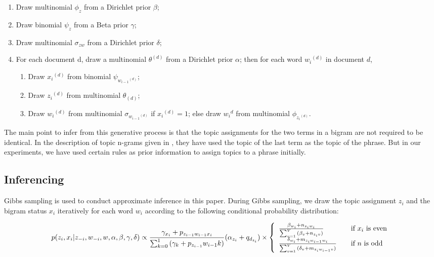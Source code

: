 \begin{enumerate}
 \item Draw multinomial \(\phi_z\) from a Dirichlet prior \(\beta\);
 \item Draw binomial \(\psi_z\) from a Beta prior \(\gamma\);
 \item Draw multinomial \(\sigma_{zw}\) from a Dirichlet prior \(\delta\);
 \item For each document d, draw a multinomial \(θ^{(d)}\) from a Dirichlet prior \(\alpha\); then for each word \({w_i}^{(d)}\) in document \(d\),
    \begin{enumerate}
     \item Draw \({x_i}^{(d)}\) from binomial \(\psi_{{w_{i-1}}^{(d)}}\);
     \item Draw \({z_i}^{(d)}\) from multinomial \(\theta_{(d)}\);
     \item Draw \({w_i}^{(d)}\) from multinomial \(\sigma_{{w_{i-1}}^{(d)}}\) if \({x_i}^{(d)} = 1\); else draw \({w_i}^{d}\) from multinomial \(\phi_{{z_i}^{(d)}}\).
    \end{enumerate}
\end{enumerate}

The main point to infer from this generative process is that the topic assignments for the two terms in a bigram are not required to be identical. In the description of
topic n-grams given in \citep*{wang2005note}, they have used the topic of the last term as the topic of the phrase. But in our experiments, we have used certain rules
as prior information to assign topics to a phrase initially.

\subsection{Inferencing}

Gibbs sampling is used to conduct approximate inference in this paper. During Gibbs sampling, we draw the topic assignment \(z_i\) and the bigram status \(x_i\) iteratively
for each word \(w_i\) according to the following conditional probability distribution:

\begin{equation}
p(z_i,x_i | z_{-i},w_{-i},w,\alpha,\beta,\gamma,\delta) \propto
\frac{\gamma_{x_i} + p_{z_{i-1}w_{i-1}x_i}}{\sum_{k=0}^1 {(\gamma_k+p_{z_{i-1}}w_{i-1}k)}} {(\alpha_{z_i} + q_{d_{z_i}})} \times \left\{ 
  \begin{array}{l l}
    \frac{\beta_{w_i} + n_{z_i w_i}}{\sum_{v=1}^V {(\beta_v+n_{z_i v})}} & \quad \text{if $x_i$ is even}\\
    \frac{\delta_{w_i} + m_{z_i w_{i-1} w_i}}{\sum_{v=1}^V {(\delta_v + m_{z_i w_{i-1} v})} } & \quad \text{if $n$ is odd}
  \end{array} \right.
\end{equation}

